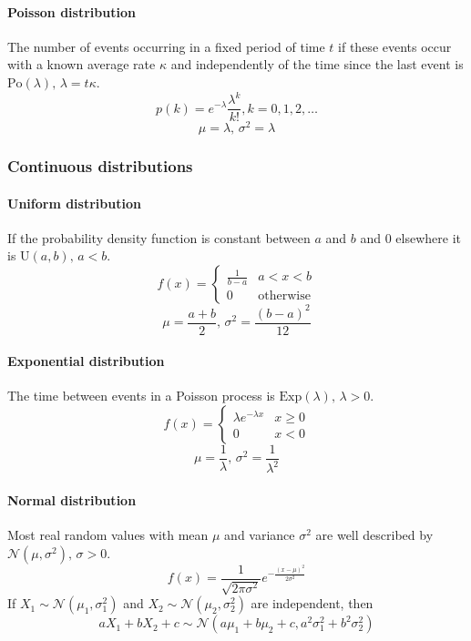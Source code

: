 \begin{multicols}{\Columns}
\paragraph{Poisson distribution}
The number of events occurring in a fixed period of time $t$ if these events occur with a known average rate $\kappa$ and independently of the time since the last event is $\textrm{Po}(\lambda),\,\lambda=t\kappa$.
\[p(k)=e^{-\lambda}\frac{\lambda^k}{k!}, k=0,1,2,\dots\]
\[\mu=\lambda,\,\sigma^2=\lambda\]

\subsubsection{Continuous distributions}

\paragraph{Uniform distribution}
If the probability density function is constant between $a$ and $b$ and 0 elsewhere it is $\textrm{U}(a,b),\,a<b$.
\[f(x) = \left\{
\begin{array}{cl}
\frac{1}{b-a} & a<x<b\\
0 & \textrm{otherwise}
\end{array}\right.\]
\[\mu=\frac{a+b}{2},\,\sigma^2=\frac{(b-a)^2}{12}\]

\paragraph{Exponential distribution}
The time between events in a Poisson process is $\textrm{Exp}(\lambda),\,\lambda>0$.
\[f(x) = \left\{
\begin{array}{cl}
\lambda e^{-\lambda x} & x\geq0\\
0 & x<0
\end{array}\right.\]
\[\mu=\frac{1}{\lambda},\,\sigma^2=\frac{1}{\lambda^2}\]

\paragraph{Normal distribution}
Most real random values with mean $\mu$ and variance $\sigma^2$ are well described by $\mathcal{N}(\mu,\sigma^2),\,\sigma>0$.
\[ f(x) = \frac{1}{\sqrt{2\pi\sigma^2}}e^{-\frac{(x-\mu)^2}{2\sigma^2}} \]
If $X_1 \sim \mathcal{N}(\mu_1,\sigma_1^2)$ and $X_2 \sim \mathcal{N}(\mu_2,\sigma_2^2)$ are independent, then
\[ aX_1 + bX_2 + c \sim \mathcal{N}(a\mu_1+b\mu_2+c,a^2\sigma_1^2+b^2\sigma_2^2) \]


\end{multicols}
